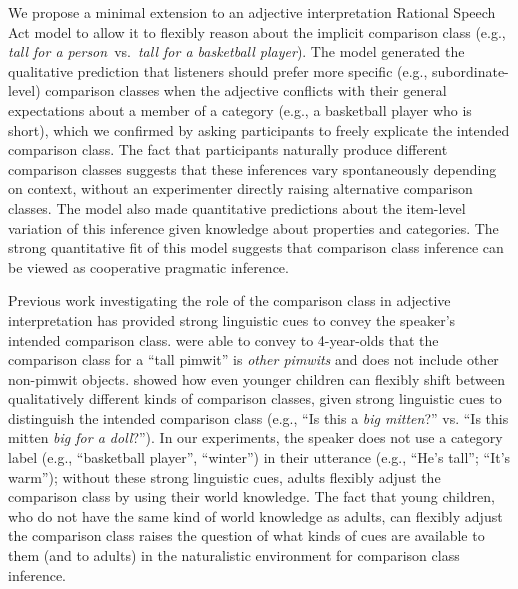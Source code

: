 \documentclass[doc, floatsintext]{apa6}
\begin{document}
We propose a minimal extension to an adjective interpretation Rational Speech Act model to allow it to flexibly reason about the implicit comparison class (e.g., \emph{tall for a person}~vs.~\emph{tall for a basketball player}).
The model generated the qualitative prediction that listeners should prefer more specific (e.g., subordinate-level) comparison classes when the adjective conflicts with their general expectations about a member of a category (e.g., a basketball player who is short), which we confirmed by asking participants to freely explicate the intended comparison class.
The fact that participants naturally produce different comparison classes suggests that these inferences vary spontaneously depending on context, without an experimenter directly raising alternative comparison classes. 
The model also made quantitative predictions about the item-level variation of this inference given knowledge about properties and categories.
The strong quantitative fit of this model suggests that comparison class inference can be viewed as cooperative pragmatic inference.



Previous work investigating the role of the comparison class in adjective interpretation has provided strong linguistic cues to convey the speaker's intended comparison class.
 were able to convey to 4-year-olds that the comparison class for a ``tall pimwit'' is \emph{other pimwits} and does not include other non-pimwit objects.
 showed how even younger children can flexibly shift between qualitatively different kinds of comparison classes, given strong linguistic cues to distinguish the intended comparison class (e.g., ``Is this a \emph{big mitten}?'' vs. ``Is this mitten \emph{big for a doll}?'').
In our experiments, the speaker does not use a category label (e.g., ``basketball player'', ``winter'') in their utterance (e.g., ``He's tall''; ``It's warm''); without these strong linguistic cues, adults flexibly adjust the comparison class by using their world knowledge.
The fact that young children, who do not have the same kind of world knowledge as adults, can flexibly adjust the comparison class raises the question of what kinds of cues are available to them (and to adults) in the naturalistic environment for comparison class inference.
\end{document}
